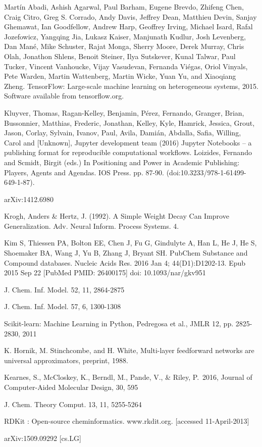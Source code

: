 	\begin{thebibliography}{9}

		Martín Abadi, Ashish Agarwal, Paul Barham, Eugene Brevdo,
Zhifeng Chen, Craig Citro, Greg S. Corrado, Andy Davis,
Jeffrey Dean, Matthieu Devin, Sanjay Ghemawat, Ian Goodfellow,
Andrew Harp, Geoffrey Irving, Michael Isard, Rafal Jozefowicz, Yangqing Jia,
Lukasz Kaiser, Manjunath Kudlur, Josh Levenberg, Dan Mané, Mike Schuster,
Rajat Monga, Sherry Moore, Derek Murray, Chris Olah, Jonathon Shlens,
Benoit Steiner, Ilya Sutskever, Kunal Talwar, Paul Tucker,
Vincent Vanhoucke, Vijay Vasudevan, Fernanda Viégas,
Oriol Vinyals, Pete Warden, Martin Wattenberg, Martin Wicke,
Yuan Yu, and Xiaoqiang Zheng.
TensorFlow: Large-scale machine learning on heterogeneous systems,
2015. Software available from tensorflow.org.

		Kluyver, Thomas, Ragan-Kelley, Benjamin, Pérez, Fernando, Granger, Brian, Bussonnier, Matthias, Frederic, Jonathan, Kelley, Kyle, Hamrick, Jessica, Grout, Jason, Corlay, Sylvain, Ivanov, Paul, Avila, Damián, Abdalla, Safia, Willing, Carol and [Unknown], Jupyter development team (2016) Jupyter Notebooks – a publishing format for reproducible computational workflows. Loizides, Fernando and Scmidt, Birgit (eds.) In Positioning and Power in Academic Publishing: Players, Agents and Agendas. IOS Press. pp. 87-90. (doi:10.3233/978-1-61499-649-1-87).
		
		arXiv:1412.6980 


	Krogh, Anders \& Hertz, J. (1992). A Simple Weight Decay Can Improve Generalization. Adv. Neural Inform. Process Systems. 4. 

		Kim S, Thiessen PA, Bolton EE, Chen J, Fu G, Gindulyte A, Han L, He J, He S, Shoemaker BA, Wang J, Yu B, Zhang J, Bryant SH. PubChem Substance and Compound databases. Nucleic Acids Res. 2016 Jan 4; 44(D1):D1202-13. Epub 2015 Sep 22 [PubMed PMID: 26400175] doi: 10.1093/nar/gkv951
		
		J. Chem. Inf. Model.  52, 11, 2864-2875		

		J. Chem. Inf. Model.  57, 6, 1300-1308

		Scikit-learn: Machine Learning in Python, Pedregosa et al., JMLR 12, pp. 2825-2830, 2011

		K. Hornik, M. Stinchcombe, and H. White, Multi-layer feedforward networks are universal 	approximators, preprint, 1988. 
		
	 Kearnes, S., McCloskey, K., Berndl, M., Pande, V., \& Riley, P.\ 2016, Journal of Computer-Aided Molecular Design, 30, 595 
	
		J. Chem. Theory Comput.  13, 11, 5255-5264
	
	 RDKit : Open-source cheminformatics. www.rkdit.org. [accessed 11-April-2013]
	
		arXiv:1509.09292 [cs.LG]
	
	

	
          
\end{thebibliography}